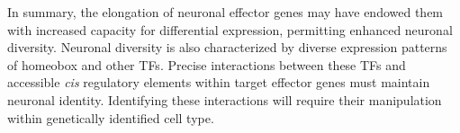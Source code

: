 In summary, the elongation of neuronal effector genes may have endowed them with increased capacity for differential expression, permitting enhanced neuronal diversity. Neuronal diversity is also characterized by diverse expression patterns of homeobox and other TFs. Precise interactions between these TFs and accessible \textit{cis} regulatory elements within target effector genes must maintain neuronal identity. Identifying these interactions will require their manipulation within genetically identified cell type.   



